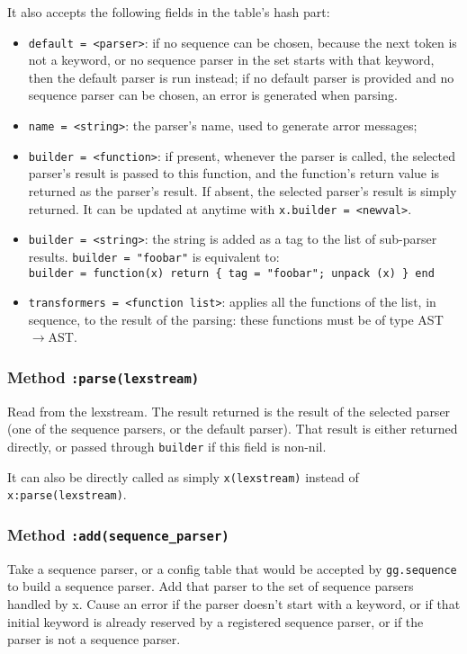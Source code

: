 It also accepts the following fields in the table's hash part:
\begin{itemize}
\item\verb|default = <parser>|: if no sequence can be chosen, because
  the next token is not a keyword, or no sequence parser in the set
  starts with that keyword, then the default parser is run instead; if
  no default parser is provided and no sequence parser can be chosen,
  an error is generated when parsing.
\item\verb|name = <string>|: the parser's name, used to generate arror
  messages;
\item\verb|builder = <function>|: if present, whenever the parser is
  called, the selected parser's result is passed to this
  function, and the function's return value is returned as the
  parser's result. If absent, the selected parser's result is simply
  returned. It can be updated at anytime with
  \verb|x.builder = <newval>|.
\item\verb|builder = <string>|: the string is added as a tag to the
  list of sub-parser results. \verb|builder = "foobar"| is equivalent
  to:\\
 \verb|builder = function(x) return { tag = "foobar"; unpack (x) } end|
\item\verb|transformers = <function list>|: applies all the functions
  of the list, in sequence, to the result of the parsing: these
  functions must be of type AST$\rightarrow$AST.
\end{itemize}

\subsubsection{Method {\tt :parse(lexstream)}}

Read from the lexstream. The result returned is the result of the selected
parser (one of the sequence parsers, or the default parser). That
result is either returned directly, or passed through \verb|builder|
if this field is non-nil.

It can also be directly called as simply \verb|x(lexstream)| instead of
\verb|x:parse(lexstream)|.

\subsubsection{Method {\tt :add(sequence\_parser)}}

Take a sequence parser, or a config table that would be accepted by
\verb|gg.sequence| to build a sequence parser. Add that parser to the
set of sequence parsers handled by x. Cause an error if the parser
doesn't start with a keyword, or if that initial keyword is already
reserved by a registered sequence parser, or if the parser is not a
sequence parser.

